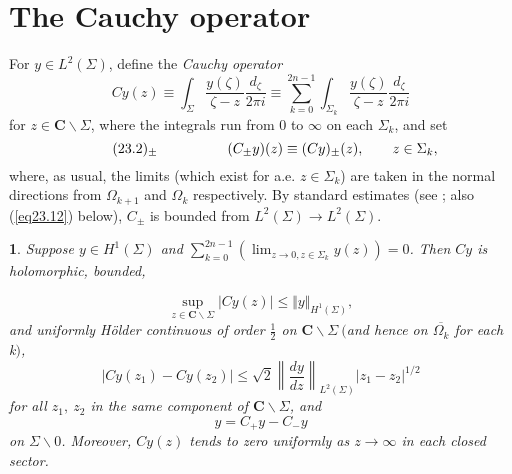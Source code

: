 \documentclass{surv-l}
\theoremstyle{plain}
\newtheorem{lemma}[theorem]{\sc{Lemma}}
\theoremstyle{definition}
\numberwithin{equation}{chapter}
\begin{document}
\section{The Cauchy operator}\label{sec23}
For $y\in L^{2}(\Sigma)$, define the \emph{Cauchy operator}
\setcounter{equation}{0}
\begin{equation}\label{eq23.1}
Cy(z)\equiv\int_{\Sigma}\frac{y(\zeta)}{\zeta-z}\frac{d_{\zeta}}{2\pi i}\equiv\sum_{k=0}^{2n-1}\int_{\Sigma_{k}}\frac{y(\zeta)}{\zeta-z}\frac{d_{\zeta}}{2\pi i}
\end{equation}
for $z\in \textbf{C}\backslash \Sigma$, where the integrals run from $0$ to $\infty$ on each $\Sigma_{k}$, and set
\begin{equation*}
\tag*{$(23.2)_{\pm}$} \qquad \qquad \quad (C_{\pm}y)(z)\equiv(Cy)_{\pm}(z),\qquad z\in\Sigma_{k},
\end{equation*}
where, as usual, the limits (which exist for a.e. $z\in\Sigma_{k}$) are taken in the normal directions from $\Omega_{k+1}$ and $\Omega_{k}$ respectively. By standard estimates (see \cite{St}; also (\ref{eq23.12}) below), $C_{\pm}$ is bounded from $L^{2}(\Sigma)\rightarrow L^{2}(\Sigma)$.
\setcounter{theorem}{2}
\begin{lemma}\label{lem23.3}
Suppose $y\in H^{1}(\Sigma)$ and $\sum_{k=0}^{2n-1}(\lim_{z\rightarrow 0, z\in\Sigma_{k}}y(z))=0$. Then $Cy$ is holomorphic, bounded,

\setcounter{equation}{3}
\begin{equation}\label{eq23.4}
\sup_{z\in \mathbf{C}\backslash \Sigma}|Cy(z)|\leq\Vert y\Vert_{H^{1}(\Sigma)},
\end{equation}
and uniformly H\"{o}lder continuous of order $ \frac{1}{2}$ on $\mathbf{C}\backslash \Sigma\ ($and hence on $\overline{\Omega_{k}}$ for each k$)$,
\renewcommand\theequation{23.5}
\setcounter{equation}{4}
\begin{equation}\label{eq23.5}
|Cy(z_{1})-Cy(z_{2})|\leq\sqrt{2}\left\|\frac{dy}{dz}\right\|_{L^{2}(\Sigma)}|z_{1}-z_{2}|^{1/2}
\end{equation}
for all $z_{1},\ z_{2}$ in the same component of $\mathbf{C}\backslash \Sigma$, and
\renewcommand\theequation{23.6}
\setcounter{equation}{5}
\begin{equation}\label{eq23.6}
y=C_{+}y-C_{-}y
\end{equation}
on $\Sigma\backslash 0$. Moreover, $Cy(z)$ tends to zero uniformly as $z\rightarrow\infty$ in each closed sector.
\end{lemma}
\end{document}
